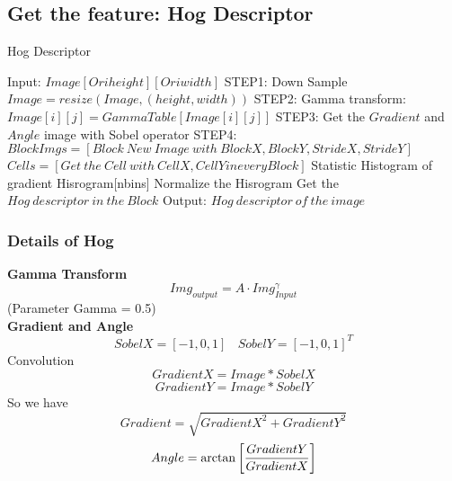 \documentclass{beamer}
\begin{document}
\subsection{Get the feature: Hog Descriptor}
\begin{frame}
\thispagestyle{empty}
\footnotesize
\begin{algorithm}[H]
\caption{Hog Descriptor}
\begin{algorithmic}
\State Input: $Image[Oriheight][Oriwidth]$
\State STEP1: Down Sample $Image = resize(Image, (height, width))$
\State STEP2: Gamma transform: $Image[i][j] = GammaTable[Image[i][j]]$
\State STEP3: Get the $Gradient$ and $Angle$ image with Sobel operator
\State STEP4: $BlockImgs = [Block\ New\ Image\ with\ BlockX, BlockY, StrideX, StrideY]$
\State $Cells = [Get\ the\ Cell\ with\ CellX, CellY in every Block]$
\State Statistic Histogram of gradient Hisrogram[nbins]
\State Normalize the Hisrogram
\EndFor
\State Get the $Hog\ descriptor\ in\ the\ Block$
\EndFor
\State Output: $Hog\ descriptor\ of\ the\ image$

\end{algorithmic}
\end{algorithm}
\end{frame}


\begin{frame}
\frametitle{Details of Hog}
\textbf{Gamma Transform}
\begin{displaymath}
Img_{output} = A\cdot Img_{Input}^{\gamma}
\end{displaymath}
(Parameter Gamma = 0.5)\\[3ex]
\textbf{Gradient and Angle}
\begin{displaymath}
SobelX = [-1, 0, 1]\ \ \ \ SobelY = [-1, 0, 1]^{T}
\end{displaymath}
Convolution
\begin{displaymath}
GradientX = Image \ast SobelX
\end{displaymath}
\begin{displaymath}
GradientY = Image \ast SobelY
\end{displaymath}
So we have 
\begin{displaymath}
Gradient = \sqrt{GradientX^2 + GradientY^2}
\end{displaymath}
\begin{displaymath}
Angle = \arctan\left[GradientY \over GradientX\right]
\end{displaymath}
\end{frame}
\end{document}
